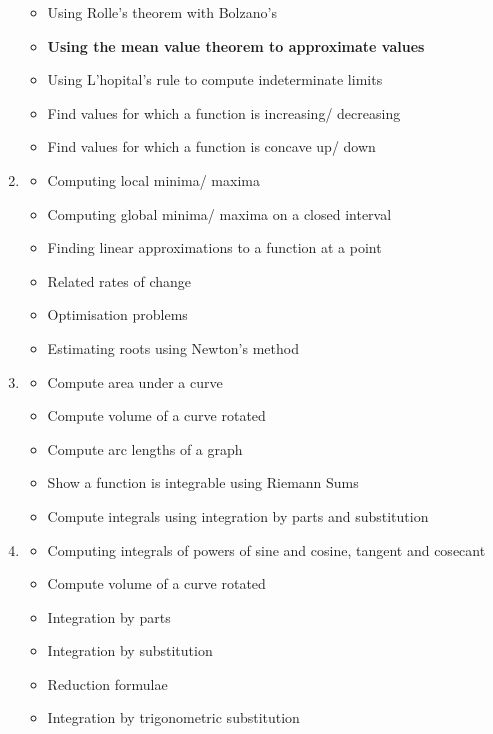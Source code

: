 \documentclass{article}
\begin{document}
\begin{multicols}{2}
\begin{enumerate}
\begin{itemize}
            \item Using Rolle's theorem with Bolzano's
            \item \textbf{Using the mean value theorem to approximate values}
            \item Using L'hopital's rule to compute indeterminate limits
            \item Find values for which a function is increasing/ decreasing
            \item Find values for which a function is concave up/ down
        \end{itemize}
    \item \begin{itemize}
            \item Computing local minima/ maxima
            \item Computing global minima/ maxima on a closed interval
            \item Finding linear approximations to a function at a point
            \item Related rates of change
            \item Optimisation problems
            \item Estimating roots using Newton's method
        \end{itemize}
    \item \begin{itemize}
            \item Compute area under a curve
            \item Compute volume of a curve rotated
            \item Compute arc lengths of a graph
            \item Show a function is integrable using Riemann Sums
            \item Compute integrals using integration by parts and substitution
        \end{itemize}
    \item \begin{itemize}
            \item Computing integrals of powers of sine and cosine, tangent and cosecant
            \item Compute volume of a curve rotated
            \item Integration by parts
            \item Integration by substitution
            \item Reduction formulae
            \item Integration by trigonometric substitution

\end{itemize}
\end{enumerate}
\end{multicols}
\end{document}
